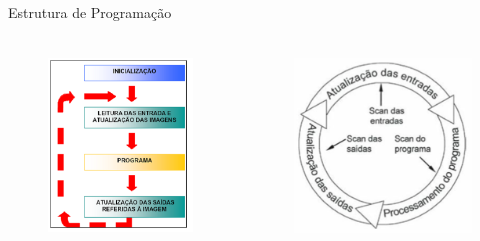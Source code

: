 \documentclass[aspectratio=169,
				xcolor=table]{beamer}
\begin{document}
	\begin{frame}{Estrutura de Programação}
	
	\begin{columns}
			\begin{column}{0.5\textwidth}
				\begin{figure}[hbtp]
				\centering
				\includegraphics[height=5cm, keepaspectratio]{../figs/cap04/fluxograma.png}
				\end{figure}
			\end{column}
			\begin{column}{0.5\textwidth}
				\begin{figure}[hbtp]
				\centering
				\includegraphics[height=5cm, keepaspectratio]{../figs/cap04/scan.png}
				\end{figure}
			\end{column}
		\end{columns}	
	\end{frame}
\end{document}
